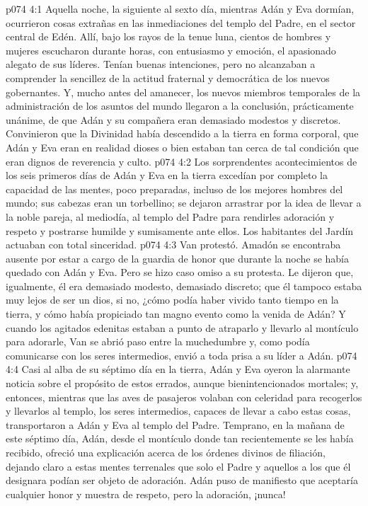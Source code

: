 \vs p074 4:1 Aquella noche, la siguiente al sexto día, mientras Adán y Eva dormían, ocurrieron cosas extrañas en las inmediaciones del templo del Padre, en el sector central de Edén. Allí, bajo los rayos de la tenue luna, cientos de hombres y mujeres escucharon durante horas, con entusiasmo y emoción, el apasionado alegato de sus líderes. Tenían buenas intenciones, pero no alcanzaban a comprender la sencillez de la actitud fraternal y democrática de los nuevos gobernantes. Y, mucho antes del amanecer, los nuevos miembros temporales de la administración de los asuntos del mundo llegaron a la conclusión, prácticamente unánime, de que Adán y su compañera eran demasiado modestos y discretos. Convinieron que la Divinidad había descendido a la tierra en forma corporal, que Adán y Eva eran en realidad dioses o bien estaban tan cerca de tal condición que eran dignos de reverencia y culto.
\vs p074 4:2 Los sorprendentes acontecimientos de los seis primeros días de Adán y Eva en la tierra excedían por completo la capacidad de las mentes, poco preparadas, incluso de los mejores hombres del mundo; sus cabezas eran un torbellino; se dejaron arrastrar por la idea de llevar a la noble pareja, al mediodía, al templo del Padre para rendirles adoración y respeto y postrarse humilde y sumisamente ante ellos. Los habitantes del Jardín actuaban con total sinceridad.
\vs p074 4:3 Van protestó. Amadón se encontraba ausente por estar a cargo de la guardia de honor que durante la noche se había quedado con Adán y Eva. Pero se hizo caso omiso a su protesta. Le dijeron que, igualmente, él era demasiado modesto, demasiado discreto; que él tampoco estaba muy lejos de ser un dios, si no, ¿cómo podía haber vivido tanto tiempo en la tierra, y cómo había propiciado tan magno evento como la venida de Adán? Y cuando los agitados edenitas estaban a punto de atraparlo y llevarlo al montículo para adorarle, Van se abrió paso entre la muchedumbre y, como podía comunicarse con los seres intermedios, envió a toda prisa a su líder a Adán.
\vs p074 4:4 Casi al alba de su séptimo día en la tierra, Adán y Eva oyeron la alarmante noticia sobre el propósito de estos errados, aunque bienintencionados mortales; y, entonces, mientras que las aves de pasajeros volaban con celeridad para recogerlos y llevarlos al templo, los seres intermedios, capaces de llevar a cabo estas cosas, transportaron a Adán y Eva al templo del Padre. Temprano, en la mañana de este séptimo día, Adán, desde el montículo donde tan recientemente se les había recibido, ofreció una explicación acerca de los órdenes divinos de filiación, dejando claro a estas mentes terrenales que solo el Padre y aquellos a los que él designara podían ser objeto de adoración. Adán puso de manifiesto que aceptaría cualquier honor y muestra de respeto, pero la adoración, ¡nunca!
